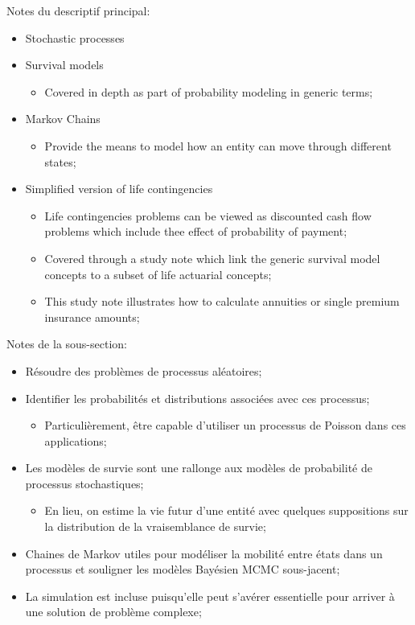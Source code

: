 \documentclass[12pt, titlepage, french]{report}
\begin{document}
\begin{distributions}[Description]
Notes du descriptif principal:
\begin{itemize}
	\item	Stochastic processes
	\item	Survival models
		\begin{itemize}
		\item	Covered in depth as part of probability modeling in generic terms;
		\end{itemize}
	\item	Markov Chains
		\begin{itemize}
		\item	Provide the means to model how an entity can move through different states;
		\end{itemize}
	\item	Simplified version of life contingencies
		\begin{itemize}
		\item	Life contingencies problems can be viewed as discounted cash flow problems which include thee effect of probability of payment;
		\item	Covered through a study note which link the generic survival model concepts to a subset of life actuarial concepts;
		\item	This study note illustrates how to calculate annuities or single premium insurance amounts;
		\end{itemize}
\end{itemize}
\tcbline
Notes de la sous-section:
\begin{itemize}
	\item	Résoudre des problèmes de processus aléatoires;
	\item	Identifier les probabilités et distributions associées avec ces processus;
		\begin{itemize}
		\item	Particulièrement, être capable d'utiliser un processus de Poisson dans ces applications;
		\end{itemize}
	\item	Les modèles de survie sont une rallonge aux modèles de probabilité de processus stochastiques;
		\begin{itemize}
		\item	En lieu, on estime la vie futur d'une entité avec quelques suppositions sur la distribution de la vraisemblance de survie;
		\end{itemize}
	\item	Chaines de Markov utiles pour modéliser la mobilité entre états dans un processus et souligner les modèles Bayésien MCMC sous-jacent;
	\item	La simulation est incluse puisqu'elle peut s'avérer essentielle pour arriver à une solution de problème complexe;
\end{itemize}
\end{distributions}
\end{document}
